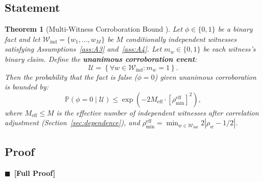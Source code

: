 \documentclass[11pt,a4paper]{article}
\newtheorem{theorem}{Theorem}[section]
\theoremstyle{definition}
\newcommand{\rigorFull}[0]{$\blacksquare$~\textbf{[Full Proof]}}
\newcommand{\Pbb}{\mathbb{P}}
\newcommand{\abs}[1]{\left|#1\right|}
\newcommand{\witnessSet}{\mathcal{W}}           %
\newcommand{\fact}{\phi}                        %
\begin{document}
\subsection{Statement}

\begin{theorem}[Multi-Witness Corroboration Bound ]
\label{thm:corroboration}
Let $\fact \in \{0, 1\}$ be a binary fact and let $\witnessSet_{\mathrm{ind}} = \{w_1, \ldots, w_M\}$ be $M$ conditionally independent witnesses satisfying Assumptions~\ref{ass:A3} and~\ref{ass:A4}. Let $m_w \in \{0, 1\}$ be each witness's binary claim. Define the \textbf{unanimous corroboration event}:
\begin{equation}
    \mathcal{U} = \left\{ \forall w \in \witnessSet_{\mathrm{ind}} : m_w = 1 \right\}.
    \label{eq:unanimous}
\end{equation}
Then the probability that the fact is false ($\fact = 0$) given unanimous corroboration is bounded by:
\begin{equation}
    \Pbb(\fact = 0 \mid \mathcal{U}) \leq \exp\left(-2 M_{\mathrm{eff}} \cdot [\rho_{\min}^{\mathrm{eff}}]^2\right),
    \label{eq:corroboration_bound}
\end{equation}
where $M_{\mathrm{eff}} \leq M$ is the effective number of independent witnesses after correlation adjustment (Section~\ref{sec:dependence}), and $\rho_{\min}^{\mathrm{eff}} = \min_{w \in \witnessSet_{\mathrm{ind}}} 2\abs{\rho_w - 1/2}$.
\end{theorem}

\subsection{Proof} \rigorFull
\end{document}
